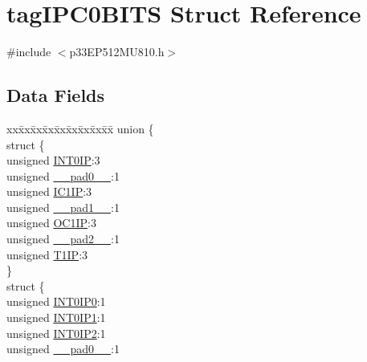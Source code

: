 \hypertarget{structtag_i_p_c0_b_i_t_s}{}\section{tag\+I\+P\+C0\+B\+I\+TS Struct Reference}
\label{structtag_i_p_c0_b_i_t_s}


{\ttfamily \#include $<$p33\+E\+P512\+M\+U810.\+h$>$}

\subsection*{Data Fields}
\begin{DoxyCompactItemize}
\item 
\begin{tabbing}
xx\=xx\=xx\=xx\=xx\=xx\=xx\=xx\=xx\=\kill
union \{\\
\>struct \{\\
\>\>unsigned \hyperlink{structtag_i_p_c0_b_i_t_s_a015cf2b58bbe40616a7272fc48249a7c}{INT0IP}:3\\
\>\>unsigned \hyperlink{structtag_i_p_c0_b_i_t_s_adf71f3d8410c1f1dbbc96680a92c49af}{\_\_pad0\_\_}:1\\
\>\>unsigned \hyperlink{structtag_i_p_c0_b_i_t_s_ac1da4ba853ea8f1cd0e671cdd5f579e9}{IC1IP}:3\\
\>\>unsigned \hyperlink{structtag_i_p_c0_b_i_t_s_acaf2d0924a107ec6e8d2e31febaf66f9}{\_\_pad1\_\_}:1\\
\>\>unsigned \hyperlink{structtag_i_p_c0_b_i_t_s_a21f3bd3853667ad5216a696de65aba73}{OC1IP}:3\\
\>\>unsigned \hyperlink{structtag_i_p_c0_b_i_t_s_a4d97cc5f7d51d22fc2bf3eab35c9cb7f}{\_\_pad2\_\_}:1\\
\>\>unsigned \hyperlink{structtag_i_p_c0_b_i_t_s_abc43f3e7e18820758bf4f0a3c5184fed}{T1IP}:3\\
\>\} \\
\>struct \{\\
\>\>unsigned \hyperlink{structtag_i_p_c0_b_i_t_s_a918402be1c66b779709b1fa1dbaee05e}{INT0IP0}:1\\
\>\>unsigned \hyperlink{structtag_i_p_c0_b_i_t_s_ae3fa589dd7e96c8d56b34943ae3e65b9}{INT0IP1}:1\\
\>\>unsigned \hyperlink{structtag_i_p_c0_b_i_t_s_ad99428356b528c8ead264a39a8cf8581}{INT0IP2}:1\\
\>\>unsigned \hyperlink{structtag_i_p_c0_b_i_t_s_adf71f3d8410c1f1dbbc96680a92c49af}{\_\_pad0\_\_}:1\\

\end{tabbing}
\end{DoxyCompactItemize}
